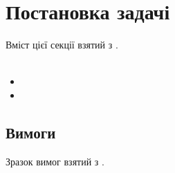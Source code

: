 \sffamily

\chapter{Постановка задачі}
Вміст цієї секції взятий з \cite{CSHPiskunov}.\\
\\
\begin{itemize}
	\item
	\item
\end{itemize}

\section{Вимоги}
Зразок вимог взятий з \cite{kulikov}. 
